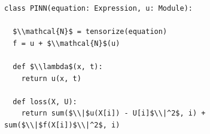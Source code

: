 \documentclass[border=10pt]{standalone}
\begin{document}
\begin{lstlisting}
class PINN(equation: Expression, u: Module):

  $\\mathcal{N}$ = tensorize(equation)
  f = u + $\\mathcal{N}$(u)

  def $\\lambda$(x, t):
    return u(x, t)
    
  def loss(X, U):
    return sum($\\|$u(X[i]) - U[i]$\\|^2$, i) + sum($\\|$f(X[i])$\\|^2$, i)
\end{lstlisting}
\end{document}
